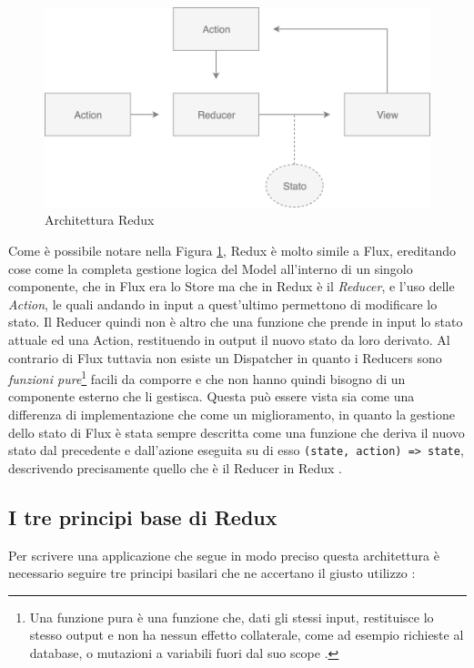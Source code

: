 \begin{figure}[h]
\centering
\vspace*{0.5cm} 
\includegraphics[width=11.5cm]{./images/ReduxWorkflow}
\caption{Architettura Redux}
\label{ReduxWorkflow}
\vspace*{0.5cm} 
\end{figure}

Come è possibile notare nella Figura \ref{ReduxWorkflow}, Redux è molto simile a Flux, ereditando cose come la completa gestione logica del Model all'interno di un singolo componente, che in Flux era lo Store ma che in Redux è il \textit{Reducer}, e l'uso delle \textit{Action}, le quali andando in input a quest'ultimo permettono di modificare lo stato. Il Reducer quindi non è altro che una funzione che prende in input lo stato attuale ed una Action, restituendo in output il nuovo stato da loro derivato.
Al contrario di Flux tuttavia non esiste un Dispatcher in quanto i Reducers sono \textit{funzioni pure}\footnote{Una funzione pura è una funzione che, dati gli stessi input, restituisce lo stesso output e non ha nessun effetto collaterale, come ad esempio richieste al database, o mutazioni a variabili fuori dal suo scope \cite{FranklinOnPureFunctions}.} facili da comporre e che non hanno quindi bisogno di un componente esterno che li gestisca. Questa può essere vista sia come una differenza di implementazione che come un miglioramento, in quanto la gestione dello stato di Flux è stata sempre descritta come una funzione che deriva il nuovo stato dal precedente e dall'azione eseguita su di esso \texttt{(state, action) => state}, descrivendo precisamente quello che è il Reducer in Redux \cite{ReduxDocumentation}.

\subsection{I tre principi base di Redux}
Per scrivere una applicazione che segue in modo preciso questa architettura è necessario seguire tre principi basilari che ne accertano il giusto utilizzo \cite{ReduxDocumentation}:


